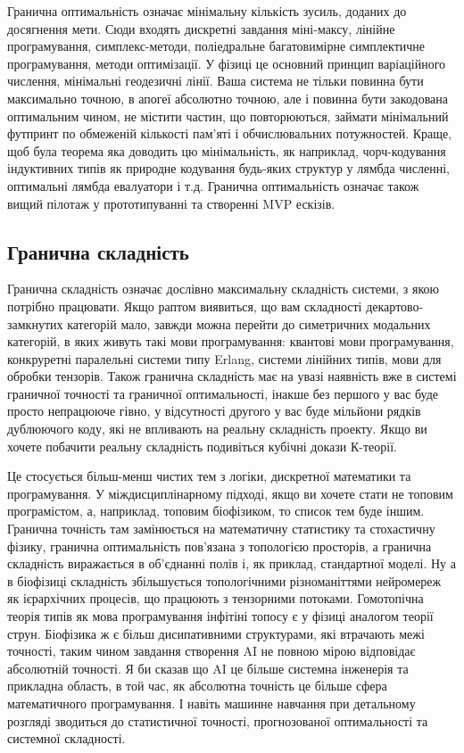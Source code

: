 Гранична оптимальність означає мінімальну кількість зусиль,
доданих до досягнення мети. Сюди входять дискретні завдання
міні-максу, лінійне програмування, симплекс-методи, поліедральне
багатовимірне симплектичне програмування, методи оптимізації.
У фізиці це основний принцип варіаційного числення, мінімальні
геодезичні лінії. Ваша система не тільки повинна бути
максимально точною, в апогеї абсолютно точною, але і
повинна бути закодована оптимальним чином, не містити
частин, що повторюються, займати мінімальний футпринт
по обмеженій кількості пам'яті і обчислювальних потужностей.
Краще, щоб була теорема яка доводить цю мінімальність,
як наприклад, чорч-кодування індуктивних типів як природне
кодування будь-яких структур у лямбда численні, оптимальні
лямбда евалуатори і т.д. Гранична оптимальність означає
також вищий пілотаж у прототипуванні та створенні MVP ескізів.

\subsection{Гранична складність}

Гранична складність означає дослівно максимальну складність
системи, з якою потрібно працювати. Якщо раптом виявиться,
що вам складності декартово-замкнутих категорій мало, завжди
можна перейти до симетричних модальних категорій, в яких живуть
такі мови програмування: квантові мови програмування,
конкруретні паралельні системи типу Erlang, системи
лінійних типів, мови для обробки тензорів. Також гранична
складність має на увазі наявність вже в системі граничної
точності та граничної оптимальності, інакше без першого у
вас буде просто непрацююче гівно, у відсутності другого у
вас буде мільйони рядків дублюючого коду, які не впливають
на реальну складність проекту. Якщо ви хочете побачити реальну
складність подивіться кубічні докази К-теорії.

Це стосується більш-менш чистих тем з логіки, дискретної
математики та програмування. У міждисциплінарному підході,
якщо ви хочете стати не топовим програмістом, а, наприклад,
топовим біофізиком, то список тем буде іншим. Гранична точність
там замінюється на математичну статистику та стохастичну фізику,
гранична оптимальність пов'язана з топологією просторів,
а гранична складність виражається в об'єднанні полів і,
як приклад, стандартної моделі. Ну а в біофізиці складність
збільшується топологічними різноманіттями нейромереж як
ієрархічних процесів, що працюють з тензорними потоками.
Гомотопічна теорія типів як мова програмування інфітіні
топосу є у фізиці аналогом теорії струн. Біофізика ж є
більш дисипативними структурами, які втрачають межі
точності, таким чином завдання створення AI не повною
мірою відповідає абсолютній точності. Я би сказав що AI
це більше системна інженерія та прикладна область, в той
час, як абсолютна точність це більше сфера математичного
програмування. І навіть машинне навчання при детальному
розгляді зводиться до статистичної точності, прогнозованої
оптимальності та системної складності.

